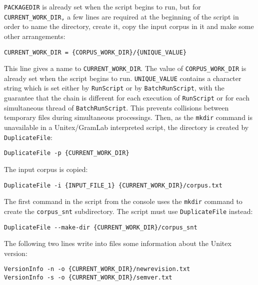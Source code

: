 \noindent \verb$PACKAGEDIR$ is already set when the script begins to run, but
for \verb$CURRENT_WORK_DIR,$ a few lines are required at the beginning of the script
in order to name the directory, create it, copy the input corpus in it and make some
other arrangements:

\begin{Verbatim}[fontsize=\small,fontfamily=helvetica]
CURRENT_WORK_DIR = {CORPUS_WORK_DIR}/{UNIQUE_VALUE}
\end{Verbatim}

\noindent This line gives a name to \verb$CURRENT_WORK_DIR$. The value of
\verb$CORPUS_WORK_DIR$ is already set when the script begins to run.
\verb$UNIQUE_VALUE$ contains a character string which is set either by \verb$RunScript$ or by
\verb$BatchRunScript$, with the guarantee that the chain is different for each execution of
\verb$RunScript$ or for each simultaneous thread of \verb$BatchRunScript$. This
prevents collisions between temporary files during simultaneous processings. Then,
as the \verb$mkdir$ command is unavailable in a Unitex/GramLab interpreted script, the
directory is created by \verb$DuplicateFile$:

\begin{Verbatim}[fontsize=\small,fontfamily=helvetica]
DuplicateFile -p {CURRENT_WORK_DIR}
\end{Verbatim}

\noindent The input corpus is copied:

\begin{Verbatim}[fontsize=\small,fontfamily=helvetica]
DuplicateFile -i {INPUT_FILE_1} {CURRENT_WORK_DIR}/corpus.txt
\end{Verbatim}

\noindent The first command in the script from the console uses the
\verb$mkdir$ command to create the \verb$corpus_snt$ subdirectory. The script must use
\verb$DuplicateFile$ instead:

\begin{Verbatim}[fontsize=\small,fontfamily=helvetica]
DuplicateFile --make-dir {CURRENT_WORK_DIR}/corpus_snt
\end{Verbatim}

\noindent The following two lines write into files some information about the Unitex version:

\begin{Verbatim}[fontsize=\small,fontfamily=helvetica]
VersionInfo -n -o {CURRENT_WORK_DIR}/newrevision.txt
VersionInfo -s -o {CURRENT_WORK_DIR}/semver.txt
\end{Verbatim}

